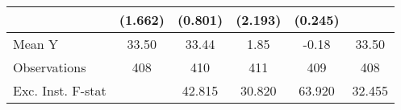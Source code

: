 {\begin{tabular}{l*{5}{c}}
            &     (1.662)         &     (0.801)         &     (2.193)         &     (0.245)         &                     \\
\midrule
Mean Y      &       33.50         &       33.44         &        1.85         &       -0.18         &       33.50         \\
Observations&         408         &         410         &         411         &         409         &         408         \\
Exc. Inst. F-stat&                     &      42.815         &      30.820         &      63.920         &      32.455         \\
\bottomrule
\end{tabular}
}
